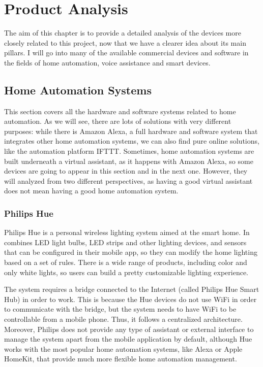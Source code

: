 \chapter{Product Analysis}

The aim of this chapter is to provide a detailed analysis of the devices more closely related to this project, now that we have a
clearer idea about its main pillars. I will go into many of the available commercial devices and software in the fields of home
automation, voice assistance and smart devices.

\section{Home Automation Systems}
This section covers all the hardware and software systems related to home automation. As we will see, there are lots of solutions
with very different purposes: while there is Amazon Alexa, a full hardware and software system that integrates other home automation
systems, we can also find pure online solutions, like the automation platform IFTTT. Sometimes, home automation systems are
built underneath a virtual assistant, as it happens with Amazon Alexa, so some devices are going to appear in this section and in the
next one. However, they will analyzed from two different perspectives, as having a good virtual assistant does not mean having a
good home automation system.

\subsection{Philips Hue}
Philips Hue is a personal wireless lighting system aimed at the smart home. In combines LED light bulbs, LED strips and other
lighting devices, and sensors that can be configured in their mobile app, so they can modify the home lighting based on a set of
rules. There is a wide range of products, including color and only white lights, so users can build a pretty customizable lighting
experience.\cite{philipsHueMeethue}

The system requires a bridge connected to the Internet (called Philips Hue Smart Hub) in order to work. This is because the Hue
devices do not use WiFi in order to communicate with the bridge, but the system needs to have WiFi to be controllable from a
mobile phone. Thus, it follows a centralized architecture. Moreover, Philips does not provide any type of assistant or external interface
to manage the system apart from the mobile application by default, although Hue works with the most popular home automation
systems, like Alexa or Apple HomeKit, that provide much more flexible home automation management.

